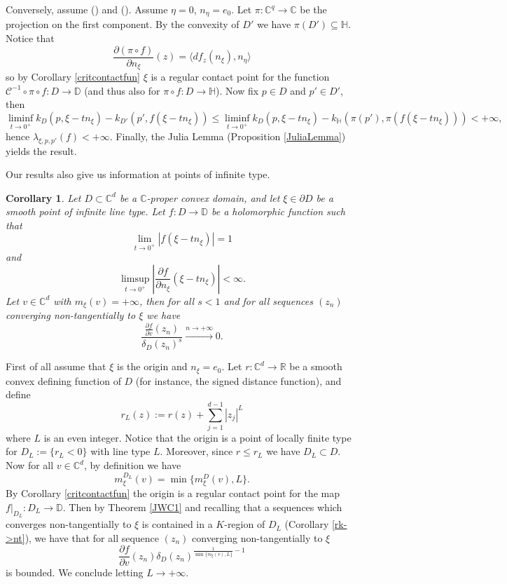 \documentclass[11pt, reqno]{amsart}
\numberwithin{equation}{section}
\newtheorem{corollary}[theorem]{Corollary}
\theoremstyle{definition}
\newcommand{\C}{\mathbb{C}}
\newcommand{\D}{\mathbb{D}}
\newcommand{\R}{\mathbb{R}}
\renewcommand{\H}{\mathbb{H}}
\begin{document}
{{{	
	Conversely, assume () and (). Assume $\eta=0$, $n_\eta=e_0$.
	Let $\pi\colon\C^{q}\to\C$ be the projection on the first component. By the convexity of $D'$ we have $\pi(D')\subseteq\H$. Notice that
	$$\frac{\partial(\pi\circ f)}{\partial n_\xi}(z)=\langle df_z(n_\xi),n_\eta\rangle$$
	so by Corollary \ref{critcontactfun} $\xi$ is a regular contact point for the function $\mathscr{C}^{-1}\circ\pi\circ f\colon D\to\D$ (and thus also for $\pi\circ f\colon D\to\H$). Now fix $p\in D$ and $p'\in D'$, then 	$$\liminf_{t\to0^+}k_D(p,\xi-tn_\xi)-k_{D'}(p',f(\xi-tn_\xi))\leq\liminf_{t\to0^+} k_D(p,\xi-tn_\xi)-k_{\H}(\pi(p'),\pi(f(\xi-tn_\xi)))<+\infty ,$$
	hence $\lambda_{\xi,p,p'}(f)<+\infty$. Finally,  the Julia Lemma (Proposition \ref{JuliaLemma}) yields the result.
	\endproof
	
	
	Our results also give us information at points of infinite type.
	\begin{corollary}
		Let $D\subset\C^d$ be  a $\C$-proper convex domain, and  let $\xi\in\partial D$ be a smooth point of infinite line type. Let $f\colon D\to \D$ be a holomorphic function such that
		$$\lim_{t\to0^+}|f(\xi-tn_\xi)|=1$$
		and
		$$\limsup_{t\to0^+}\left|\frac{\partial f}{\partial n_\xi}(\xi-tn_\xi)\right|<\infty.	$$
		Let  $v\in\C^d$ with $m_\xi(v)=+\infty$, then for all $s<1$ and for all sequences $(z_n)$ converging non-tangentially to $\xi$ we have
		$$\frac{\frac{\partial f}{\partial v}(z_n)}{\delta_D(z_n)^s}\stackrel{n\to+\infty} \longrightarrow 0.$$
	\end{corollary}
	\proof
	First of all assume that $\xi$ is the origin and $n_\xi=e_0$. Let $r\colon \C^d\to\R$ be a smooth convex defining function of $D$ (for instance, the signed distance function), and define 
	$$r_{L}(z):=r(z)+\sum_{j=1}^{d-1}|z_j|^L$$
	where $L$ is an even integer. Notice that the origin is a point of locally finite type for $D_L:=\{r_L<0\}$ with line type $L$. Moreover, since $r\leq r_L$ we have $D_L\subset D$.
	Now for all $v\in\C^d$, by definition we have
	$$m^{D_L}_\xi(v)=\min\{m^D_\xi(v),L\}.$$
	By Corollary \ref{critcontactfun} the origin is a regular contact point for the map $f|_{D_L}:D_L\to \D$. Then by Theorem \ref{JWC1} and recalling that a sequences which converges non-tangentially to $\xi$ is contained in a $K$-region of $D_L$ (Corollary \ref{rk->nt}), we have that for all sequence $(z_n)$ converging non-tangentially to $\xi$
	$$\frac{\partial f}{\partial v}(z_n) \delta_D(z_n)^{\frac{1}{\min\{m_\xi(v),L\}}-1}$$
	is bounded.
	We conclude letting $L\to+\infty$.
	\endproof
	
}}}
\end{document}
